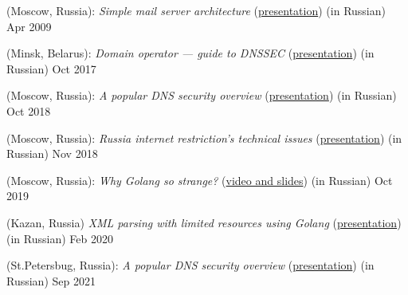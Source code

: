  (Moscow, Russia): \textit{Simple mail server architecture} (\href{https://www.slideshare.net/Dolce727/ss-1278915}{presentation}) (in Russian) \hfill Apr 2009

 (Minsk, Belarus): \textit{Domain operator --- guide to DNSSEC} (\href{https://www.slideshare.net/schors/enog14-dnssec}{presentation}) (in Russian) \hfill Oct 2017

 (Moscow, Russia): \textit{A popular DNS security overview} (\href{https://www.slideshare.net/schors/a-popular-dns-security-overview-modern-theory-and-practice-116166410}{presentation}) (in Russian) \hfill Oct 2018

 (Moscow, Russia): \textit{Russia internet restriction's technical issues} (\href{https://www.slideshare.net/schors/ss-123038251}{presentation}) (in Russian) \hfill Nov 2018

 (Moscow, Russia): \textit{Why Golang so strange?} (\href{https://golangconf.ru/2019/abstracts/5753}{video and slides}) (in Russian) \hfill Oct 2019

 (Kazan, Russia) \textit{XML parsing with limited resources using Golang}  (\href{https://www.slideshare.net/schors/xml-vds}{presentation}) (in Russian) \hfill Feb 2020

 (St.Petersbug, Russia): \textit{A popular DNS security overview} (\href{https://www.slideshare.net/schors/a-popular-dns-security-overview}{presentation}) (in Russian) \hfill Sep 2021

